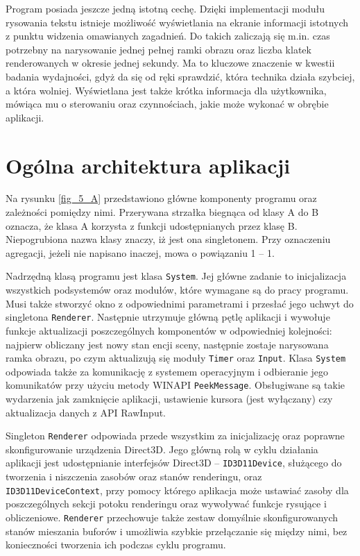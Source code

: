 	Program posiada jeszcze jedną istotną cechę. Dzięki implementacji modułu rysowania tekstu istnieje możliwość wyświetlania na ekranie informacji istotnych z punktu widzenia omawianych zagadnień. Do takich zaliczają się m.in. czas potrzebny na narysowanie jednej pełnej ramki obrazu oraz liczba klatek renderowanych w okresie jednej sekundy. Ma to kluczowe znaczenie w kwestii badania wydajności, gdyż da się od ręki sprawdzić, która technika działa szybciej, a która wolniej. Wyświetlana jest także krótka informacja dla użytkownika, mówiąca mu o sterowaniu oraz czynnościach, jakie może wykonać w obrębie aplikacji.

	\section{Ogólna architektura aplikacji}
	\label{t:budowa:architektura}
	
	
	Na rysunku \ref{fig_5_A} przedstawiono główne komponenty programu oraz zależności pomiędzy nimi. Przerywana strzałka biegnąca od klasy A do B oznacza, że klasa A korzysta z funkcji udostępnianych przez klasę B. Niepogrubiona nazwa klasy znaczy, iż jest ona singletonem. Przy oznaczeniu agregacji, jeżeli nie napisano inaczej, mowa o powiązaniu 1 -- 1.
	
	
	Nadrzędną klasą programu jest klasa \texttt{System}. Jej główne zadanie to inicjalizacja wszystkich podsystemów oraz modułów, które wymagane są do pracy programu. Musi także stworzyć okno z odpowiednimi parametrami i przesłać jego uchwyt do singletona \texttt{Renderer}. Następnie utrzymuje główną pętlę aplikacji i wywołuje funkcje aktualizacji poszczególnych komponentów w odpowiedniej kolejności: najpierw obliczany jest nowy stan encji sceny, następnie zostaje narysowana ramka obrazu, po czym aktualizują się moduły \texttt{Timer} oraz \texttt{Input}. Klasa \texttt{System} odpowiada także za komunikację z systemem operacyjnym i odbieranie jego komunikatów przy użyciu metody WINAPI \texttt{PeekMessage}. Obsługiwane są takie wydarzenia jak zamknięcie aplikacji, ustawienie kursora (jest wyłączany) czy aktualizacja danych z API RawInput.
	
	Singleton \texttt{Renderer} odpowiada przede wszystkim za inicjalizację oraz poprawne skonfigurowanie urządzenia Direct3D. Jego główną rolą w cyklu działania aplikacji jest udostępnianie interfejsów Direct3D -- \texttt{ID3D11Device}, służącego do tworzenia i niszczenia zasobów oraz stanów renderingu, oraz \texttt{ID3D11DeviceContext}, przy pomocy którego aplikacja może ustawiać zasoby dla poszczególnych sekcji potoku renderingu oraz wywoływać funkcje rysujące i obliczeniowe. \texttt{Renderer} przechowuje także zestaw domyślnie skonfigurowanych stanów mieszania buforów i umożliwia szybkie przełączanie się między nimi, bez konieczności tworzenia ich podczas cyklu programu.
	
